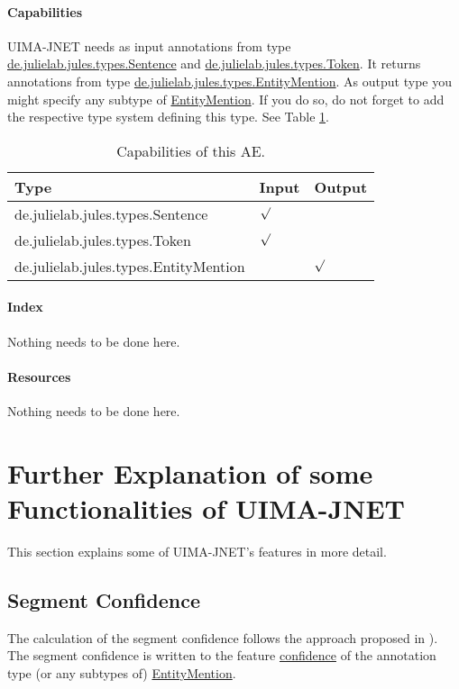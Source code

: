 \documentclass[11pt,a4paper,halfparskip]{scrartcl}
\begin{document}
\paragraph{Capabilities}
\label{sss:capabilities}
UIMA-JNET needs as input annotations from type
\url{de.julielab.jules.types.Sentence} and
\url{de.julielab.jules.types.Token}. It returns annotations from type
\url{de.julielab.jules.types.EntityMention}. As output type you might
specify any subtype of \url{EntityMention}. If you do so, do not
forget to add the respective type system defining this type.  See
Table \ref{tab:capabilities}.
\begin{table}[h!]
  \centering
  \begin{tabular}{|p{5cm}|p{2cm}|p{2cm}|}
    \hline
    Type & Input & Output \\
    \hline\hline
     de.julielab.jules.types.Sentence &  $\surd$ & \\
      \hline
     de.julielab.jules.types.Token &  $\surd$ & \\
      \hline
     de.julielab.jules.types.EntityMention & &  $\surd$  \\
      \hline
  \end{tabular}
  \caption{Capabilities of this AE.}
  \label{tab:capabilities}
\end{table} 



\paragraph{Index}

Nothing needs to be done here.

\paragraph{Resources}

Nothing needs to be done here.


\section{Further Explanation of some Functionalities of UIMA-JNET}

This section explains some of UIMA-JNET's features in more detail. 

\subsection{Segment Confidence}
\label{sss:segconf}
The calculation of the segment confidence follows the approach
proposed in \cite{Culotta2004}). The segment confidence is written to
the feature \url{confidence} of the annotation type (or any subtypes
of) \url{EntityMention}.
\end{document}

